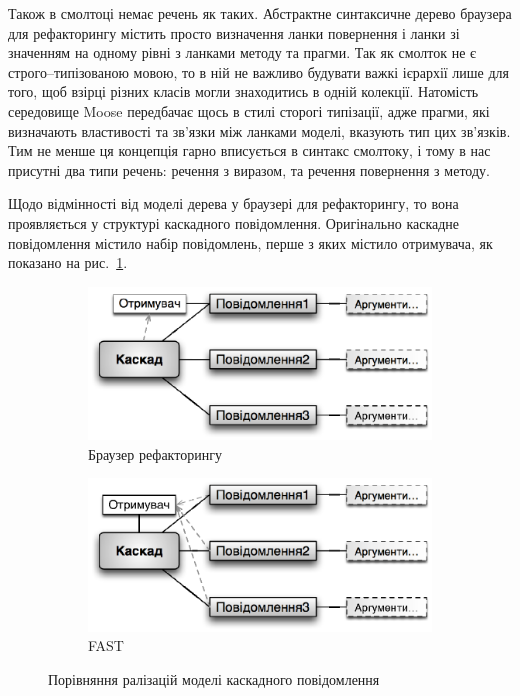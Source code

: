 \documentclass[12pt,a4paper]{article}
\begin{document}
Також в смолтоці немає речень як таких. Абстрактне синтаксичне дерево браузера для рефакторингу містить просто визначення ланки повернення і ланки зі значенням на одному рівні з ланками методу та прагми. Так як смолток не є строго--типізованою мовою, то в ній не важливо будувати важкі ієрархії лише для того, щоб взірці різних класів могли знаходитись в одній колекції. Натомість середовище Moose передбачає щось в стилі сторогі типізації, адже прагми, які визначають властивості та зв'язки між ланками моделі, вказують тип цих зв'язків. Тим не менше ця концепція гарно вписується в синтакс смолтоку, і тому в нас присутні два типи речень: речення з виразом, та речення повернення з методу.

Щодо відмінності від моделі дерева у браузері для рефакторингу, то вона проявляється у структурі каскадного повідомлення. Оригінально каскадне повідомлення містило набір повідомлень, перше з яких містило отримувача, як показано на рис.~\ref{rbCascade}.
\begin{figure}[h]
        \centering
        \begin{subfigure}[b]{0.45\textwidth}
                \centering
                \includegraphics[width=\textwidth]{rbCascade}
                \caption{Браузер рефакторингу\label{rbCascade}}
        \end{subfigure}\quad
        \begin{subfigure}[b]{0.45\textwidth}
                \centering
                \includegraphics[width=\textwidth]{fastCascade}
                \caption{FAST\label{fastCascade}}
        \end{subfigure}
        \caption{Порівняння ралізацій моделі каскадного повідомлення}
\end{figure}
\end{document}
